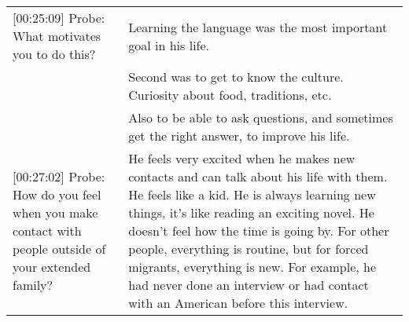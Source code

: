 \begin{longtable}{p{}p{}}
{[}00:25:09{]} Probe: What motivates you to do this?                                                                                                            & Learning the language was the most important goal in his life.                                                                                                                                                                                                                                                                                                                                                                                                                                                                                                                                  \\
                                                                                                                                                                & Second was to get to know the culture. Curiosity about food, traditions, etc.                                                                                                                                                                                                                                                                                                                                                                                                                                                                                                                   \\
                                                                                                                                                                & Also to be able to ask questions, and sometimes get the right answer, to improve his life.                                                                                                                                                                                                                                                                                                                                                                                                                                                                                                      \\
{[}00:27:02{]} Probe: How do you feel when you make contact with people outside of your extended family?                                                        & He feels very excited when he makes new contacts and can talk about his life with them. He feels like a kid. He is always learning new things, it's like reading an exciting novel. He doesn't feel how the time is going by. For other people, everything is routine, but for forced migrants, everything is new. For example, he had never done an interview or had contact with an American before this interview.                                                                                                                                                                           \\

\end{longtable}

